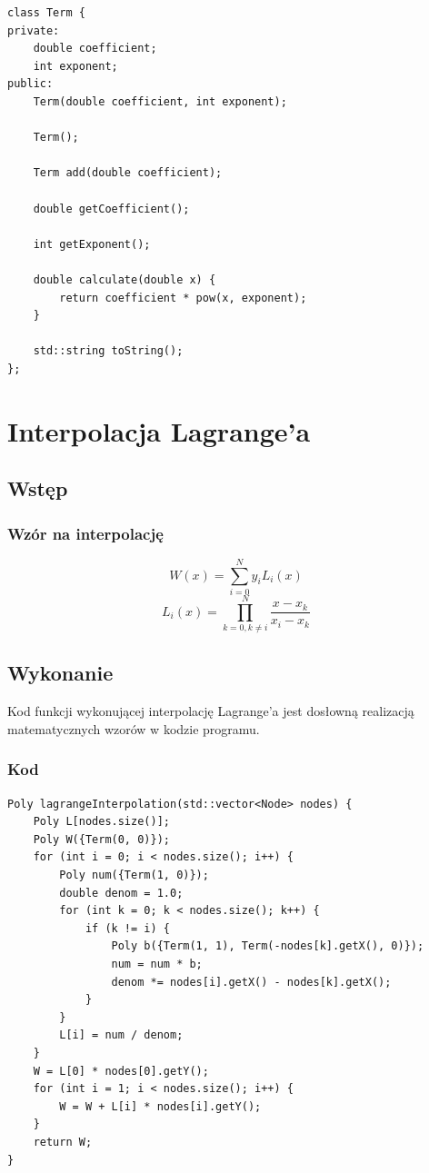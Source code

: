 \documentclass{article}
\begin{document}
    \lstset {language=C++}
    \begin{lstlisting}[caption={Klasa Term}]
class Term {
private:
    double coefficient;
    int exponent;
public:
    Term(double coefficient, int exponent);

    Term();

    Term add(double coefficient);

    double getCoefficient();

    int getExponent();

    double calculate(double x) {
        return coefficient * pow(x, exponent);
    }

    std::string toString();
};
    \end{lstlisting}
    \pagebreak

    \section{Interpolacja Lagrange'a}
    \subsection{Wstęp}
    \subsubsection{Wzór na interpolację}
    \begin{displaymath}
        W(x)=\sum^N_{i=0}y_iL_i(x)
    \end{displaymath}
    \begin{displaymath}
            L_i(x)=\prod^{N}_{k=0, k\neq i}\frac{x-x_k}{x_i-x_k}
    \end{displaymath}
    \subsection{Wykonanie}
    Kod funkcji wykonującej interpolację Lagrange'a jest dosłowną realizacją matematycznych wzorów w kodzie programu.
    \subsubsection{Kod}
    \lstset {language=C++}
    \begin{lstlisting}[caption={Interpolacja metodą Lagrange'a}]
Poly lagrangeInterpolation(std::vector<Node> nodes) {
    Poly L[nodes.size()];
    Poly W({Term(0, 0)});
    for (int i = 0; i < nodes.size(); i++) {
        Poly num({Term(1, 0)});
        double denom = 1.0;
        for (int k = 0; k < nodes.size(); k++) {
            if (k != i) {
                Poly b({Term(1, 1), Term(-nodes[k].getX(), 0)});
                num = num * b;
                denom *= nodes[i].getX() - nodes[k].getX();
            }
        }
        L[i] = num / denom;
    }
    W = L[0] * nodes[0].getY();
    for (int i = 1; i < nodes.size(); i++) {
        W = W + L[i] * nodes[i].getY();
    }
    return W;
}
    \end{lstlisting}
    \vspace{5px}
    
\end{document}
